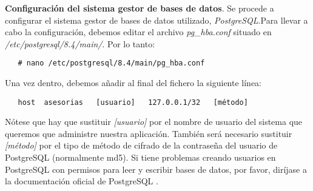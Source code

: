 \item \textbf{Configuración del sistema gestor de bases de datos}.
   Se procede a configurar el sistema gestor de bases de datos utilizado,
   \textit{PostgreSQL}.Para llevar a cabo la configuración, debemos editar
   el archivo \textit{pg\_hba.conf} situado en
   \textit{/etc/postgresql/8.4/main/}. Por lo tanto:

   \begin{verbatim}
   # nano /etc/postgresql/8.4/main/pg_hba.conf
   \end{verbatim}

   Una vez dentro, debemos añadir al final del fichero la siguiente línea:

   \begin{verbatim}
   host  asesorias   [usuario]   127.0.0.1/32   [método]
   \end{verbatim}

   Nótese que hay que sustituir \textit{[usuario]} por el nombre de usuario del
   sistema que queremos que administre nuestra aplicación. También será
   necesario sustituir \textit{[método]} por el tipo de método de cifrado de la
   contraseña del usuario de PostgreSQL (normalmente md5). Si tiene problemas
   creando usuarios en PostgreSQL con permisos para leer y escribir bases de
   datos, por favor, diríjase a la documentación oficial de PostgreSQL
   \cite{postgresql}.